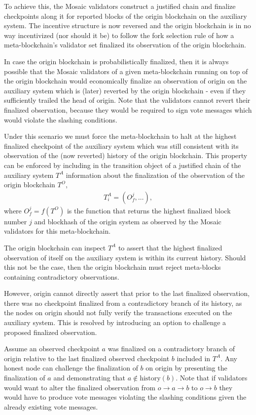 \documentclass[12pt,a4paper]{article}
\begin{document}
To achieve this, the Mosaic validators construct a justified chain and finalize checkpoints along it for reported blocks of the origin blockchain on the auxiliary system.
The incentive structure is now reversed and the origin blockchain is in no way incentivized (nor should it be) to follow the fork selection rule of how a meta-blockchain's validator set finalized its observation of the origin blockchain.

In case the origin blockchain is probabilistically finalized, then it is always possible that the Mosaic validators of a given meta-blockchain running on top of the origin blockchain would economically finalize an observation of origin on the auxiliary system which is (later) reverted by the origin blockchain - even if they sufficiently trailed the head of origin.
Note that the validators cannot revert their finalized observation, because they would be required to sign vote messages which would violate the slashing conditions.

Under this scenario we must force the meta-blockchain to halt at the highest finalized checkpoint of the auxiliary system which was still consistent with its observation of the (now reverted) history of the origin blockchain.
This property can be enforced by including in the transition object of a justified chain of the auxiliary system $T^A$ information about the finalization of the observation of the origin blockchain $T^O$,
\begin{align*}
  T^A_i = (O^j_f, \dots),
\end{align*}
where $O^j_f = f(T^O)$ is the function that returns the highest finalized block number $j$ and blockhash of the origin system as observed by the Mosaic validators for this meta-blockchain.

The origin blockchain can inspect $T^A$ to assert that the highest finalized observation of itself on the auxiliary system is within its current history.
Should this not be the case, then the origin blockchain must reject meta-blocks containing contradictory observations.

However, origin cannot directly assert that prior to the last finalized observation, there was no checkpoint finalized from a contradictory branch of its history, as the nodes on origin should not fully verify the transactions executed on the auxiliary system.
This is resolved by introducing an option to challenge a proposed finalized observation.

Assume an observed checkpoint $a$ was finalized on a contradictory branch of origin relative to the last finalized observed checkpoint $b$ included in $T^A$.
Any honest node can challenge the finalization of $b$ on origin by presenting the finalization of $a$ and demonstrating that $a \notin \text{history}(b)$.
Note that if validators would want to alter the finalized observation from $o \rightarrow a \rightarrow b$ to $o \rightarrow b$ they would have to produce vote messages violating the slashing conditions given the already existing vote messages.
\end{document}
